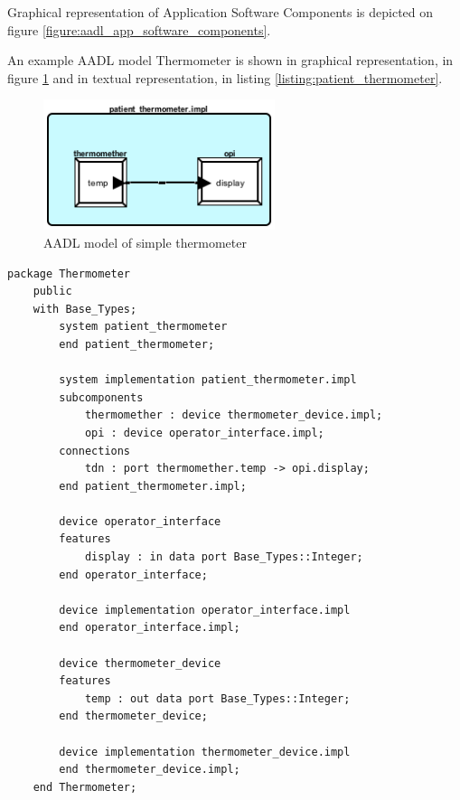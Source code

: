 Graphical representation of Application Software Components is depicted on figure \ref{figure:aadl_app_software_components}.

An example AADL model Thermometer is shown in graphical representation, in figure \ref{figure:patient_thermometer} and in textual representation, in listing \ref{listing:patient_thermometer}.

\begin{figure}[ht]%
    \begin{center}
    	\includegraphics[height=1.5in]{figures/patient_thermometer.png}
    	\caption{AADL model of simple thermometer}
    \end{center}
    \label{figure:patient_thermometer}
\end{figure}

\singlespacing
\begin{lstlisting}[language=aadl, frame=single, gobble=0, caption={AADL model of simple thermometer}, label={listing:patient_thermometer}]
	package Thermometer
	public
	with Base_Types;
		system patient_thermometer
		end patient_thermometer;

		system implementation patient_thermometer.impl
		subcomponents
			thermomether : device thermometer_device.impl;
			opi : device operator_interface.impl;
		connections
			tdn : port thermomether.temp -> opi.display;
		end patient_thermometer.impl;

		device operator_interface
		features
			display : in data port Base_Types::Integer;
		end operator_interface;

		device implementation operator_interface.impl
		end operator_interface.impl;

		device thermometer_device
		features
			temp : out data port Base_Types::Integer;
		end thermometer_device;

		device implementation thermometer_device.impl
		end thermometer_device.impl;
	end Thermometer;
\end{lstlisting} 
\doublespacing

